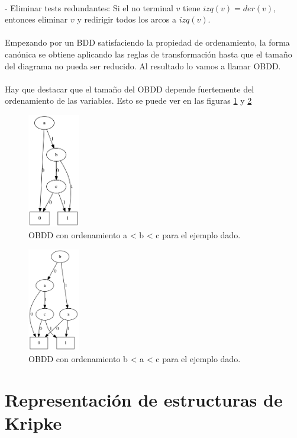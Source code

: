 \\
- Eliminar tests redundantes: Si el no terminal $v$ tiene $izq(v) = der(v)$, entonces eliminar $v$ y redirigir todos los arcos a $izq(v)$.\\
\\
Empezando por un BDD satisfaciendo la propiedad de ordenamiento, la forma canónica se obtiene aplicando las reglas de transformación hasta que el tamaño del diagrama no pueda ser reducido. Al resultado lo vamos a llamar OBDD.\\
\\
Hay que destacar que el tamaño del OBDD depende fuertemente del ordenamiento de las variables. Esto se puede ver en las figuras \ref{fig:gord1} y \ref{fig:bord1}
\begin{figure}[H]
  \centering
  \includegraphics[width=0.2\textwidth]{Figures/goodorder.png}
  \caption{OBDD con ordenamiento a < b < c para el ejemplo dado.}
  \label{fig:gord1}
\end{figure}
\begin{figure}[H]
  \centering
  \includegraphics[width=0.2\textwidth]{Figures/badorder.png}
  \caption{OBDD con ordenamiento b < a < c para el ejemplo dado.}
  \label{fig:bord1}
\end{figure}

\section{Representación de estructuras de Kripke}

